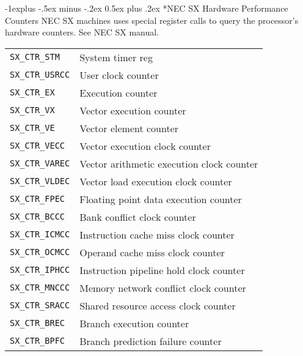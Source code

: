 \documentclass[a4paper,10pt,landscape]{article}
\makeatletter
\renewcommand{\subsection}{\@startsection{subsection}{2}{0mm}%
                                {-1explus -.5ex minus -.2ex}%
                                {0.5ex plus .2ex}%
                                {\normalfont\normalsize\bfseries}}
\makeatother
\begin{document}
\begin{multicols}{3}
\subsection*{NEC SX Hardware Performance Counters}
NEC SX machines uses special register calls to query the processor's  hardware counters. See NEC SX manual.
\begin{tabular}{@{}ll@{}}
\texttt{SX\_CTR\_STM}   & System timer reg\\
\texttt{SX\_CTR\_USRCC} & User clock counter\\
\texttt{SX\_CTR\_EX}    & Execution counter\\
\texttt{SX\_CTR\_VX }   & Vector execution counter\\
\texttt{SX\_CTR\_VE}    & Vector element counter\\
\texttt{SX\_CTR\_VECC}  & Vector execution clock counter\\
\texttt{SX\_CTR\_VAREC} & Vector arithmetic execution clock counter\\
\texttt{SX\_CTR\_VLDEC} & Vector load execution clock counter\\
\texttt{SX\_CTR\_FPEC}  & Floating point data execution counter\\
\texttt{SX\_CTR\_BCCC}  & Bank conflict clock counter\\
\texttt{SX\_CTR\_ICMCC} & Instruction cache miss clock counter\\
\texttt{SX\_CTR\_OCMCC} & Operand cache miss clock counter\\
\texttt{SX\_CTR\_IPHCC} & Instruction pipeline hold clock counter\\
\texttt{SX\_CTR\_MNCCC} & Memory network conflict clock counter\\
\texttt{SX\_CTR\_SRACC} & Shared resource access clock counter\\
\texttt{SX\_CTR\_BREC}  & Branch execution counter\\
\texttt{SX\_CTR\_BPFC}  & Branch prediction failure counter
\end{tabular}


\end{multicols}
\end{document}
